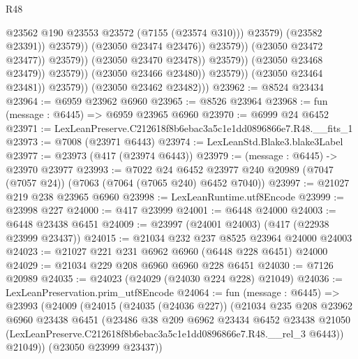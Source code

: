 \begin{lexlean}{R48}
\begin{coremodule}
                                                      @23562
                                                      @190
                                                      @23553
                                                      @23572
                                                      (@7155 (@23574 @310)))
                                                    @23579)
                                                  (@23582 @23391))
                                                @23579))
                                            (@23050 @23474 @23476))
                                          @23579))
                                      (@23050 @23472 @23477))
                                    @23579))
                                (@23050 @23470 @23478))
                              @23579))
                          (@23050 @23468 @23479))
                        @23579))
                    (@23050 @23466 @23480))
                  @23579))
              (@23050 @23464 @23481))
            @23579))
        (@23050 @23462 @23482)))
@23962 := @8524 @23434
@23964 := @6959 @23962 @6960
@23965 := @8526 @23964
@23968 := fun (message : @6445) => @6959 @23965 @6960
@23970 := @6999 @24 @6452
@23971 := LexLeanPreserve.C212618f8b6ebac3a5c1e1dd0896866e7.R48.__fits_1
@23973 := @7008 (@23971 @6443)
@23974 := LexLeanStd.Blake3.blake3Label
@23977 := @23973 (@417 (@23974 @6443))
@23979 := (message : @6445) -> @23970 @23977
@23993 := @7022
    @24
    @6452
    @23977
    @240
    @20989
    (@7047 (@7057 @24))
    (@7063 (@7064 (@7065 @240) @6452 @7040))
@23997 := @21027 @219 @238 @23965 @6960
@23998 := LexLeanRuntime.utf8Encode
@23999 := @23998 @227
@24000 := @417 @23999
@24001 := @6448 @24000
@24003 := @6448 @23438 @6451
@24009 := @23997 (@24001 @24003) (@417 (@22938 @23999 @23437))
@24015 := @21034 @232 @237 @8525 @23964 @24000 @24003
@24023 := @21027 @221 @231 @6962 @6960 (@6448 @228 @6451) @24000
@24029 := @21034 @229 @208 @6960 @6960 @228 @6451
@24030 := @7126 @20989
@24035 := @24023 (@24029 (@24030 @224 @228) @21049)
@24036 := LexLeanPreservation.prim_utf8Encode
@24064 := fun (message : @6445) =>
  @23993
    (@24009
      (@24015
        (@24035 (@24036 @227))
        (@21034
          @235
          @208
          @23962
          @6960
          @23438
          @6451
          (@23486
            @38
            @209
            @6962
            @23434
            @6452
            @23438
            @21050
            (LexLeanPreserve.C212618f8b6ebac3a5c1e1dd0896866e7.R48.__rel_3 @6443))
          @21049))
      (@23050 @23999 @23437))

\end{coremodule}
\end{lexlean}

